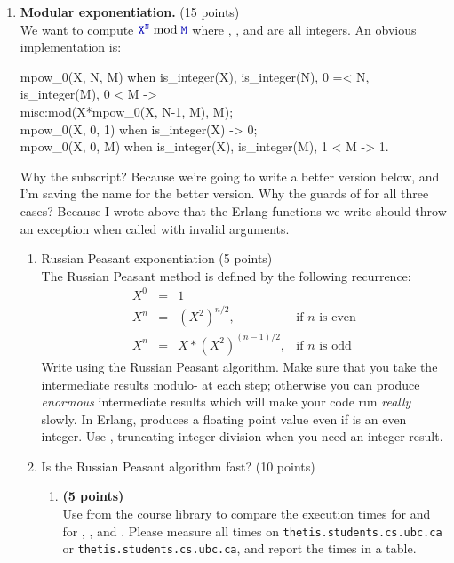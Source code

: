 \documentclass{article}
\begin{document}
\begin{enumerate}
    \item \textbf{Modular exponentiation.}  (15 points)\label{q:russian}\\
    We want to compute $\code{X}^{\code{\scriptsize{}N}} \bmod \code{M}$ where
    , , and  are all integers.
    An obvious implementation is:
    \begin{xcode}
      mpow\_0(X, N, M) when is\_integer(X), is\_integer(N), 0 =< N, is\_integer(M), 0 < M ->\\
      \>misc:mod(X*mpow\_0(X, N-1, M), M);\\
      mpow\_0(X, 0, 1) when is\_integer(X) -> 0;\\
      mpow\_0(X, 0, M) when is\_integer(X), is\_integer(M), 1 < M -> 1.
    \end{xcode}
    Why the  subscript?
    Because we're going to write a better version below,
    and I'm saving the name  for the better version.
    Why the guards of  for all three cases?
    Because I wrote above that the Erlang functions we write should throw
    an exception when called with invalid arguments.
    \begin{enumerate}
      \item Russian Peasant exponentiation (5 points)\\
	The Russian Peasant method is defined by the following recurrence:
	\begin{displaymath}\begin{array}{rcll}
	  X^0 &=& 1\\
	  X^n &=& (X^2)^{n/2}, & \textrm{if $n$ is even}\\
	  X^n &=& X*(X^2)^{(n-1)/2}, & \textrm{if $n$ is odd}
	\end{array}\end{displaymath}
	Write  using the Russian Peasant algorithm.
	Make sure that you take the intermediate results modulo- at each step;
	otherwise you can produce \emph{enormous} intermediate results which will make
	your code run \emph{really} slowly.
	In Erlang,  produces a floating point value even if  is an even integer.
	Use , truncating integer division when you need an integer result.
      \item Is the Russian Peasant algorithm fast? (10 points)\\
	\begin{enumerate}
	  \item \textbf{(5 points)}\\
	    Use  from the course library to compare the execution times
	    for  and  for ,
	    , and .
	    Please measure all times on \texttt{thetis.students.cs.ubc.ca}
	    or \texttt{thetis.students.cs.ubc.ca}, and report
	    the times in a table.


\end{enumerate}
\end{enumerate}
\end{enumerate}
\end{document}

